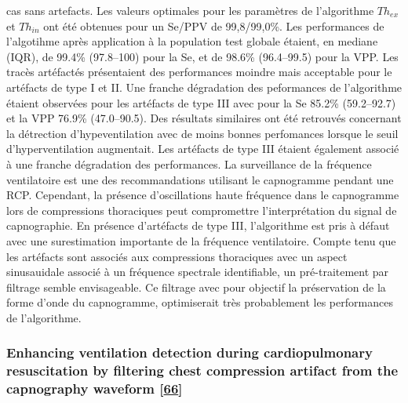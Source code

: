 \documentclass[12pt,]{article}
\begin{document}
cas sans artefacts. Les valeurs optimales pour les paramètres de
l'algorithme \(Th_{ex}\) et \(Th_{in}\) ont été obtenues pour un Se/PPV
de 99,8/99,0\%. Les performances de l'algotihme après application à la
population test globale étaient, en mediane (IQR), de 99.4\% (97.8--100)
pour la Se, et de 98.6\% (96.4--99.5) pour la VPP. Les tracès artéfactés
présentaient des performances moindre mais acceptable pour le artéfacts
de type I et II. Une franche dégradation des peformances de l'algorithme
étaient observées pour les artéfacts de type III avec pour la Se 85.2\%
(59.2--92.7) et la VPP 76.9\% (47.0--90.5). Des résultats similaires ont
été retrouvés concernant la détrection d'hypeventilation avec de moins
bonnes perfomances lorsque le seuil d'hyperventilation augmentait. Les
artéfacts de type III étaient également associé à une franche
dégradation des performances. La surveillance de la fréquence
ventilatoire est une des recommandations utilisant le capnogramme
pendant une RCP. Cependant, la présence d'oscillations haute fréquence
dans le capnogramme lors de compressions thoraciques peut compromettre
l'interprétation du signal de capnographie. En présence d'artéfacts de
type III, l'algorithme est pris à défaut avec une surestimation
importante de la fréquence ventilatoire. Compte tenu que les artéfacts
sont associés aux compressions thoraciques avec un aspect sinusauidale
associé à un fréquence spectrale identifiable, un pré-traitement par
filtrage semble envisageable. Ce filtrage avec pour objectif la
préservation de la forme d'onde du capnogramme, optimiserait très
probablement les performances de l'algorithme.

\hypertarget{enhancing-ventilation-detection-during-cardiopulmonary-resuscitation-by-filtering-chest-compression-artifact-from-the-capnography-waveform-gutierrez2018enhancing}{%
\subsubsection{\texorpdfstring{Enhancing ventilation detection during
cardiopulmonary resuscitation by filtering chest compression artifact
from the capnography waveform
{[}\protect\hyperlink{ref-gutierrez2018enhancing}{66}{]}}{Enhancing ventilation detection during cardiopulmonary resuscitation by filtering chest compression artifact from the capnography waveform {[}66{]}}}\label{enhancing-ventilation-detection-during-cardiopulmonary-resuscitation-by-filtering-chest-compression-artifact-from-the-capnography-waveform-gutierrez2018enhancing}}
\end{document}
